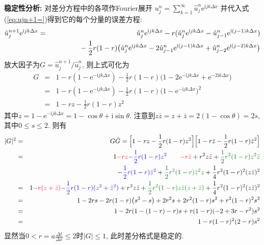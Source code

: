 \begin{solution}
\vspace{1em}
\noindent\textbf{稳定性分析:} 对差分方程中的各项作Fourier展开
$u_{j}^{n}=\sum_{k=1}^{\infty}\hat{u}_{j}^{n}\mathrm{e}^{\mathrm{i}jk\Delta x}$
并代入式(\ref{eq:ujn+1=})得到它的每个分量的误差方程:
{\setlength\arraycolsep{2pt}
\begin{eqnarray*}
\hat{u}_{j}^{n+1}\mathrm{e}^{\mathrm{i}jk\Delta x} & = & \hat{u}_{j}^{n}\mathrm{e}^{\mathrm{i}jk\Delta x}-r(\hat{u}_{j}^{n}\mathrm{e}^{\mathrm{i}jk\Delta x}-\hat{u}_{j-1}^{n}\mathrm{e}^{\mathrm{i}(j-1)k\Delta x})\\
 &  & \hphantom{\hat{u}_{j}^{n}\mathrm{e}^{\mathrm{i}jk\Delta x}}-\frac{1}{2}r(1-r)\big(\hat{u}_{j}^{n}\mathrm{e}^{\mathrm{i}jk\Delta x}-2\hat{u}_{j-1}^{n}\mathrm{e}^{\mathrm{i}(j-1)k\Delta x}+\hat{u}_{j-2}^{n}\mathrm{e}^{\mathrm{i}(j-2)k\Delta x}\big)
\end{eqnarray*}}
放大因子为$G=\hat{u}_{j}^{n+1}/\hat{u}_{j}^{n}$, 则上式可化为
{\setlength\arraycolsep{2pt}
\begin{eqnarray*}
G & = & 1-r(1-\mathrm{e}^{-\mathrm{i}jk\Delta x})-\frac{1}{2}r(1-r)\big(1-2\mathrm{e}^{-\mathrm{i}jk\Delta x}+\mathrm{e}^{-2\mathrm{i}k\Delta x}\big)\\
 & = & 1-r(1-\mathrm{e}^{-\mathrm{i}jk\Delta x})-\frac{1}{2}r(1-r)\big(1-\mathrm{e}^{-\mathrm{i}jk\Delta x}\big)^{2}\\
 & = & 1-rz-\frac{1}{2}r(1-r)z^{2}
\end{eqnarray*}}
其中$z=1-\mathrm{e}^{-\mathrm{i}jk\Delta x}=1-\cos\theta+\mathrm{i}\sin\theta$.
注意到$z\bar{z}=z+\bar{z}=2(1-\cos\theta)=2s$, 其中$0\leq s\leq2$. 则有
{\setlength\arraycolsep{2pt}
\begin{eqnarray*}
|G|^{2} & = & G\bar{G}=\Big[1-rz-\frac{1}{2}r(1-r)z^{2}\Big]\Big[1-r\bar{z}-\frac{1}{2}r(1-r)\bar{z}^{2}\Big]\\
 & = & 1\textcolor{red}{-rz}\textcolor{blue}{-\frac{1}{2}r(1-r)z^{2}}\qquad
       \textcolor{red}{-r\bar{z}}+r^{2}z\bar{z}+\textcolor{DarkGreen}{\frac{1}{2}r^2(1-r)z^{2}\bar{z}}\\
 &  & \hphantom{1-rz-\frac{1}{2}r(1-r)z^{2}\qquad}
 \textcolor{blue}{-\frac{1}{2}r(1-r)\bar{z}^{2}}+\textcolor{DarkGreen}{\frac{1}{2}r^{2}(1-r)\bar{z}^{2}z}+\frac{1}{4}r^{2}(1-r)^{2}(z\bar{z})^{2}\\
 & = & 1\textcolor{red}{-r(z+\bar{z})}\textcolor{blue}{-\frac{1}{2}r(1-r)(z^{2}+\bar{z}^{2})}+r^{2}z\bar{z}+\textcolor{DarkGreen}{\frac{1}{2}r^{2}(1-r)z\bar{z}(z+\bar{z})}+\frac{1}{4}r^{2}(1-r)^{2}(z\bar{z})^{2}\\
 & = & 1-2rs-2r(1-r)\big(s^{2}-s\big)+2r^{2}s+2r^{2}(1-r)s^{2}+r^{2}(1-r)^{2}s^{2}\\
 & = & 1-2r(1-(1-r)-r)s+r(1-r)(-2+3r-r^{2})s^{2}\\
 & = & 1-r(1-r)^{2}(2-r)s^{2}
\end{eqnarray*}}
显然当$0<r=a\frac{\Delta t}{\Delta x}\leq2$时$|G|\leq1$, 此时差分格式是稳定的.
\end{solution} 
